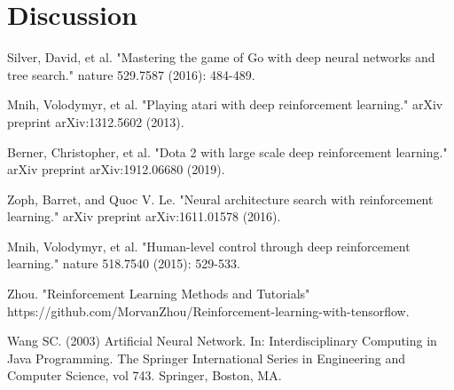 \documentclass[12pt]{article}
\begin{document}

\section{Discussion}




\begin{thebibliography}{99}
	Silver, David, et al. "Mastering the game of Go with deep neural networks and tree search." nature 529.7587 (2016): 484-489.

	Mnih, Volodymyr, et al. "Playing atari with deep reinforcement learning." arXiv preprint arXiv:1312.5602 (2013).

	Berner, Christopher, et al. "Dota 2 with large scale deep reinforcement learning." arXiv preprint arXiv:1912.06680 (2019).

    Zoph, Barret, and Quoc V. Le. "Neural architecture search with reinforcement learning." arXiv preprint arXiv:1611.01578 (2016).

    Mnih, Volodymyr, et al. "Human-level control through deep reinforcement learning." nature 518.7540 (2015): 529-533.

    Zhou. "Reinforcement Learning Methods and Tutorials" https://github.com/MorvanZhou/Reinforcement-learning-with-tensorflow.

    Wang SC. (2003) Artificial Neural Network. In: Interdisciplinary Computing in Java Programming. The Springer International Series in Engineering and Computer Science, vol 743. Springer, Boston, MA.
\end{thebibliography}
\end{document}
